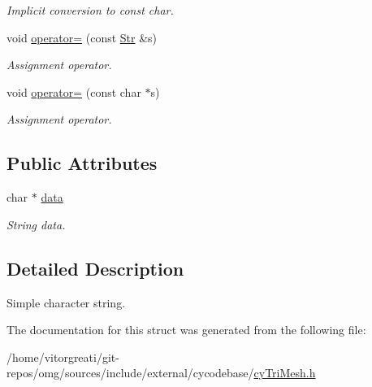 \begin{DoxyCompactItemize}
\begin{DoxyCompactList}\small\item\em Implicit conversion to const char. \end{DoxyCompactList}\item 
\mbox{\label{structcy_1_1_tri_mesh_1_1_str_aea7af58ee0c12d35ba2fc7ae23cbde7f}} 
void \mbox{\hyperlink{structcy_1_1_tri_mesh_1_1_str_aea7af58ee0c12d35ba2fc7ae23cbde7f}{operator=}} (const \mbox{\hyperlink{structcy_1_1_tri_mesh_1_1_str}{Str}} \&s)
\begin{DoxyCompactList}\small\item\em Assignment operator. \end{DoxyCompactList}\item 
\mbox{\label{structcy_1_1_tri_mesh_1_1_str_a89bd29b7c6c1152c55125fd5b60d7053}} 
void \mbox{\hyperlink{structcy_1_1_tri_mesh_1_1_str_a89bd29b7c6c1152c55125fd5b60d7053}{operator=}} (const char $\ast$s)
\begin{DoxyCompactList}\small\item\em Assignment operator. \end{DoxyCompactList}\end{DoxyCompactItemize}
\subsection*{Public Attributes}
\begin{DoxyCompactItemize}
\item 
\mbox{\label{structcy_1_1_tri_mesh_1_1_str_a5e2f3c02b2c696fde6a5e293d0e7c2b5}} 
char $\ast$ \mbox{\hyperlink{structcy_1_1_tri_mesh_1_1_str_a5e2f3c02b2c696fde6a5e293d0e7c2b5}{data}}
\begin{DoxyCompactList}\small\item\em String data. \end{DoxyCompactList}\end{DoxyCompactItemize}


\subsection{Detailed Description}
Simple character string. 

The documentation for this struct was generated from the following file\+:\begin{DoxyCompactItemize}
\item 
/home/vitorgreati/git-\/repos/omg/sources/include/external/cycodebase/\mbox{\hyperlink{cy_tri_mesh_8h}{cy\+Tri\+Mesh.\+h}}\end{DoxyCompactItemize}
